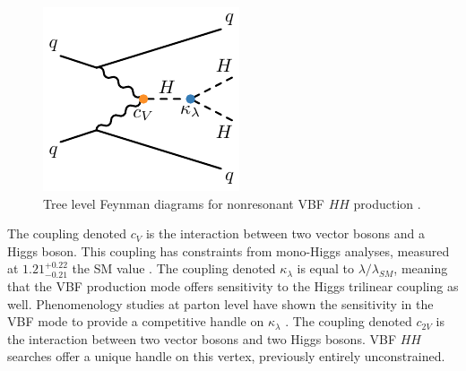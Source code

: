 \begin{figure}[!thp]
\begin{minipage}[c]{.31\textwidth}
    \end{minipage}
    \begin{minipage}[c]{.31\textwidth}
        \includegraphics[width=\textwidth]{chapters/chapter1_theory/images/vbf_klambda.pdf}
    \end{minipage}

    \caption[Tree level Feynman diagrams for nonresonant \gls{VBF} $HH$ production]{Tree level Feynman diagrams for nonresonant \gls{VBF} $HH$ production \cite{vbf_4b}.}
    \label{fig:vbf_feyn}
\end{figure}

The coupling denoted $c_V$ is the interaction between two vector bosons and a Higgs boson. This coupling has constraints from mono-Higgs analyses, measured at $1.21^{+0.22}_{-0.21}$ the \gls{SM} value \cite{higgs-measurements}. The coupling denoted $\kappa_{\lambda}$ is equal to $\lambda/\lambda_{SM}$, meaning that the \gls{VBF} production mode offers sensitivity to the Higgs trilinear coupling as well. Phenomenology studies at parton level have shown the sensitivity in the \gls{VBF} mode to provide a competitive handle on $\kappa_{\lambda}$ \cite{vbf_lambda}. The coupling denoted $c_{2V}$ is the interaction between two vector bosons and two Higgs bosons. \gls{VBF} $HH$ searches offer a unique handle on this vertex, previously entirely unconstrained.

